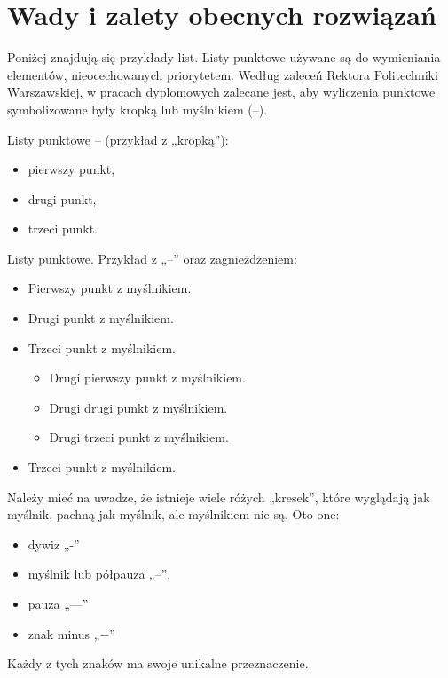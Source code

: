 \section{Wady i zalety obecnych rozwiązań}
\noindent Poniżej znajdują się przykłady list. Listy punktowe używane są do wymieniania elementów, 
nieocechowanych priorytetem. Według zaleceń Rektora Politechniki Warszawskiej, w pracach
dyplomowych zalecane jest, aby wyliczenia punktowe symbolizowane były kropką
lub myślnikiem (--).

\noindent Listy punktowe -- (przykład z „kropką”):
\begin{itemize}
    \item pierwszy punkt,
    \item drugi punkt,
    \item trzeci punkt.
\end{itemize}

\noindent Listy punktowe. Przykład z „--” oraz zagnieżdżeniem: 
\begin{itemize}[]
    \item Pierwszy punkt z myślnikiem.
    \item Drugi punkt z myślnikiem.
    \item Trzeci punkt z myślnikiem.
    \begin{itemize}
        \item Drugi pierwszy punkt z myślnikiem.
        \item Drugi drugi punkt z myślnikiem.
        \item Drugi trzeci punkt z myślnikiem.
    \end{itemize} 
    
    \item Trzeci punkt z myślnikiem.
\end{itemize}

\noindent Należy mieć na uwadze, że istnieje wiele różych „kresek”, które wyglądają jak 
myślnik, pachną jak myślnik, ale myślnikiem nie są. Oto one:
\begin{itemize}[]
    \item dywiz „-”
    \item myślnik lub półpauza „--”,
    \item pauza „---”
    \item znak minus „$-$”
\end{itemize}   
Każdy z tych znaków ma swoje unikalne przeznaczenie. 

